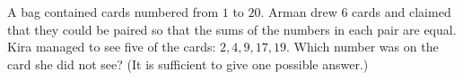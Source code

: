 A bag contained cards numbered from $1$ to $20$. Arman drew $6$ cards and claimed that they could be paired so that the sums of the numbers in each pair are equal. Kira managed to see five of the cards: $2, 4, 9, 17, 19$. Which number was on the card she did not see? (It is sufficient to give one possible answer.)
